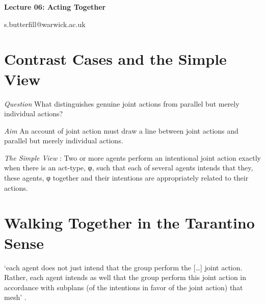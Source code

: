 \documentclass[12pt]{extarticle}
\date{}
\makeatletter
\def \ititle {Origins of Mind}
\def \iemail{s.butterfill@warwick.ac.uk}
\makeatother
\begin{document}
\begin{multicols*}{3}

\setlength\footnotesep{1em}










\def \ititle {Lecture 06: Acting Together}

\begin{center}

{\Large

\textbf{\ititle}

}



\iemail %

\end{center}



\section{Contrast Cases and the Simple View}

\emph{Question}
What distinguishes genuine joint actions from parallel but merely individual actions?



\emph{Aim}
An account of joint action must draw a line between joint actions and parallel but
merely individual actions.



\emph{The Simple View}
:
Two or more agents perform an intentional joint action exactly when there is an act-type, φ, such that each of several agents intends that they, these agents, φ  together and their intentions are  appropriately related  to their actions.




\section{Walking Together in the Tarantino Sense}

`each agent does not just intend that the group perform the […] joint action. Rather, each agent intends as well that the group perform this joint action in accordance with subplans (of the intentions in favor of the joint action) that mesh' \citep[p.\ 332]{Bratman:1992mi}.


\end{multicols*}
\end{document}

